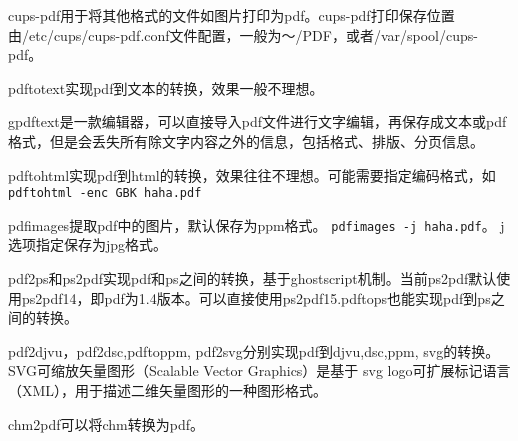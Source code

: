 cups-pdf用于将其他格式的文件如图片打印为pdf。cups-pdf打印保存位置由/etc/cups/cups-pdf.conf文件配置，一般为～/PDF，或者/var/spool/cups-pdf。

pdftotext实现pdf到文本的转换，效果一般不理想。

gpdftext是一款编辑器，可以直接导入pdf文件进行文字编辑，再保存成文本或pdf格式，但是会丢失所有除文字内容之外的信息，包括格式、排版、分页信息。

pdftohtml实现pdf到html的转换，效果往往不理想。可能需要指定编码格式，如
\verb+pdftohtml -enc GBK haha.pdf +

pdfimages提取pdf中的图片，默认保存为ppm格式。
\verb+pdfimages -j haha.pdf+。
j选项指定保存为jpg格式。

pdf2ps和ps2pdf实现pdf和ps之间的转换，基于ghostscript机制。当前ps2pdf默认使用ps2pdf14，即pdf为1.4版本。可以直接使用ps2pdf15.pdftops也能实现pdf到ps之间的转换。

pdf2djvu，pdf2dsc,pdftoppm, pdf2svg分别实现pdf到djvu,dsc,ppm, svg的转换。SVG可缩放矢量图形（Scalable Vector Graphics）是基于  svg logo可扩展标记语言（XML），用于描述二维矢量图形的一种图形格式。

chm2pdf可以将chm转换为pdf。



